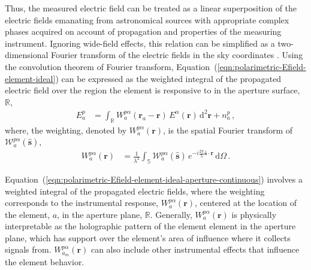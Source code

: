\documentclass[
  journal=pasa,
  manuscript=article-type,
  year=2020,
  volume=37,
]{cup-journal}
\begin{document}
Thus, the measured electric field can be treated as a linear superposition of the electric fields emanating from astronomical sources with appropriate complex phases acquired on account of propagation and properties of the measuring instrument. Ignoring wide-field effects, this relation can be simplified as a two-dimensional Fourier transform of the electric fields in the sky coordinates \cite{TMS2017}. Using the convolution theorem of Fourier transform, Equation~(\ref{eqn:polarimetric-Efield-element-ideal}) can be expressed as the weighted integral of the propagated electric field over the region the element is responsive to in the aperture surface, $\mathbb{R}$, 
\begin{align}
    E_{a}^p &= \int_\mathbb{R} W_{a}^{p\alpha}(\boldsymbol{r}_{a} - \boldsymbol{r})\,E^\alpha(\boldsymbol{r}) \, \mathrm{d}^2 \boldsymbol{r}+ n_{a}^p \, , \label{eqn:polarimetric-Efield-element-ideal-aperture-continuous}
\end{align}
where, the weighting, denoted by $W_{a}^{p\alpha}(\boldsymbol{r})$, is the spatial Fourier transform of $\mathcal{W}_{a}^{p\alpha}(\hat{\boldsymbol{s}})$,
\begin{align}
    W_{a}^{p\alpha}(\boldsymbol{r}) &= \frac{1}{\lambda^2}\int_\mathbb{S} \mathcal{W}_{a}^{p\alpha}(\hat{\boldsymbol{s}})\, e^{-i\frac{2\pi}{\lambda} \hat{\boldsymbol{s}}\cdot \boldsymbol{r}} \,\mathrm{d}\Omega \, . \label{eqn:holographic-Efield-illumination}
\end{align}

Equation~(\ref{eqn:polarimetric-Efield-element-ideal-aperture-continuous}) involves a weighted integral of the propagated electric fields, where the weighting corresponds to the instrumental response, $W_{a}^{p\alpha}(\boldsymbol{r})$, centered at the location of the element, $a$, in the aperture plane, $\mathbb{R}$. Generally, $W_{a}^{p\alpha}(\boldsymbol{r})$ is physically interpretable as the holographic pattern of the element element in the aperture plane, which has support over the element's area of influence where it collects signals from. 
$W_{a_m}^{p\alpha}(\boldsymbol{r})$ can also include other instrumental effects that influence the element behavior. 
\end{document}
